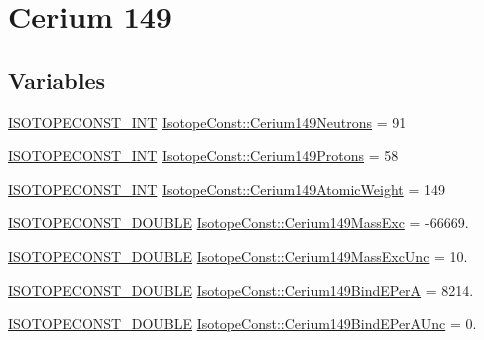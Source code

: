 \hypertarget{group___isotope_const-_cerium-_ce149}{}\section{Cerium 149}
\label{group___isotope_const-_cerium-_ce149}
\subsection*{Variables}
\begin{DoxyCompactItemize}
\item 
\mbox{\hyperlink{group___isotope_const-_macros_ga5f18360b3e99483a35c32d789e62621c}{I\+S\+O\+T\+O\+P\+E\+C\+O\+N\+S\+T\+\_\+\+I\+NT}} \mbox{\hyperlink{group___isotope_const-_cerium-_ce149_gab059391c3939bad3a83262f7a5358b9a}{Isotope\+Const\+::\+Cerium149\+Neutrons}} = 91
\item 
\mbox{\hyperlink{group___isotope_const-_macros_ga5f18360b3e99483a35c32d789e62621c}{I\+S\+O\+T\+O\+P\+E\+C\+O\+N\+S\+T\+\_\+\+I\+NT}} \mbox{\hyperlink{group___isotope_const-_cerium-_ce149_ga1458bca64e411bfe10b4dd7eb8f981ef}{Isotope\+Const\+::\+Cerium149\+Protons}} = 58
\item 
\mbox{\hyperlink{group___isotope_const-_macros_ga5f18360b3e99483a35c32d789e62621c}{I\+S\+O\+T\+O\+P\+E\+C\+O\+N\+S\+T\+\_\+\+I\+NT}} \mbox{\hyperlink{group___isotope_const-_cerium-_ce149_gad2223aafb8740b77c226259ccfae88a7}{Isotope\+Const\+::\+Cerium149\+Atomic\+Weight}} = 149
\item 
\mbox{\hyperlink{group___isotope_const-_macros_ga8f45a7272ce02c0b4c65c44636ed719a}{I\+S\+O\+T\+O\+P\+E\+C\+O\+N\+S\+T\+\_\+\+D\+O\+U\+B\+LE}} \mbox{\hyperlink{group___isotope_const-_cerium-_ce149_ga16a5f68b82759f50b6ac1dc398a312e3}{Isotope\+Const\+::\+Cerium149\+Mass\+Exc}} = -\/66669.
\item 
\mbox{\hyperlink{group___isotope_const-_macros_ga8f45a7272ce02c0b4c65c44636ed719a}{I\+S\+O\+T\+O\+P\+E\+C\+O\+N\+S\+T\+\_\+\+D\+O\+U\+B\+LE}} \mbox{\hyperlink{group___isotope_const-_cerium-_ce149_ga13bcd4e91073f84c9ce2d20daed44787}{Isotope\+Const\+::\+Cerium149\+Mass\+Exc\+Unc}} = 10.
\item 
\mbox{\hyperlink{group___isotope_const-_macros_ga8f45a7272ce02c0b4c65c44636ed719a}{I\+S\+O\+T\+O\+P\+E\+C\+O\+N\+S\+T\+\_\+\+D\+O\+U\+B\+LE}} \mbox{\hyperlink{group___isotope_const-_cerium-_ce149_ga9053020ee7ebf07dea16244588cb861d}{Isotope\+Const\+::\+Cerium149\+Bind\+E\+PerA}} = 8214.
\item 
\mbox{\hyperlink{group___isotope_const-_macros_ga8f45a7272ce02c0b4c65c44636ed719a}{I\+S\+O\+T\+O\+P\+E\+C\+O\+N\+S\+T\+\_\+\+D\+O\+U\+B\+LE}} \mbox{\hyperlink{group___isotope_const-_cerium-_ce149_ga33a564a1861c7b24b4edeb04dcafa4fe}{Isotope\+Const\+::\+Cerium149\+Bind\+E\+Per\+A\+Unc}} = 0.

\end{DoxyCompactItemize}
